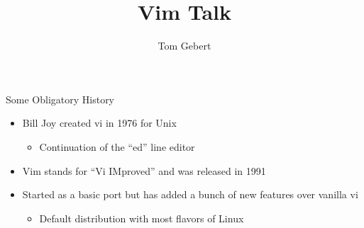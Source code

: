 \documentclass{beamer}
\title{Vim Talk}
\author{Tom Gebert}
\begin{document}
\begin{frame}{Some Obligatory History}
  \begin{itemize}
	  \item Bill Joy created vi in 1976 for Unix \begin{itemize}
			  \item Continuation of the ``ed'' line editor
	  \end{itemize}
          \item Vim stands for ``Vi IMproved'' and was released in 1991
	  \item Started as a basic port but has added a bunch of new features over vanilla vi \begin{itemize}
			\item Default distribution with most flavors of Linux
	  \end{itemize}
		  
          
  \end{itemize}
\end{frame}
\end{document}
